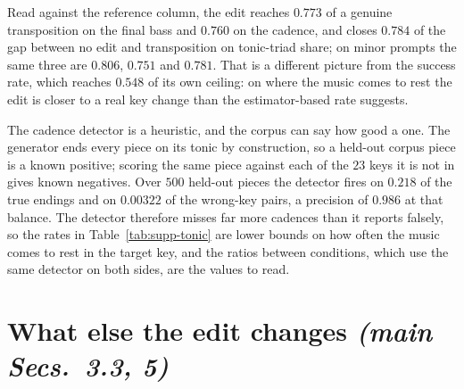 \documentclass{article}
\begin{document}
Read against the reference column, the edit reaches $0.773$ of a genuine
transposition on the final bass and $0.760$ on the cadence, and closes $0.784$ of the
gap between no edit and transposition on tonic-triad share; on minor prompts the same
three are $0.806$, $0.751$ and $0.781$. That is a different picture from the success
rate, which reaches $0.548$ of its own ceiling: on where the music comes to rest the
edit is closer to a real key change than the estimator-based rate suggests.

The cadence detector is a heuristic, and the corpus can say how good a one. The
generator ends every piece on its tonic by construction, so a held-out corpus piece is
a known positive; scoring the same piece against each of the $23$ keys it is not in
gives known negatives. Over $500$ held-out pieces the detector fires on $0.218$ of the
true endings and on $0.00322$ of the wrong-key pairs, a precision of $0.986$ at that
balance. The detector therefore misses far more cadences than it reports falsely, so the
rates in Table~\ref{tab:supp-tonic} are lower bounds on how often the music comes to
rest in the target key, and the ratios between conditions, which use the same detector
on both sides, are the values to read.

\section{What else the edit changes \normalfont\textit{(main Secs.~3.3, 5)}}
\label{sec:selectivity}
%
\end{document}
